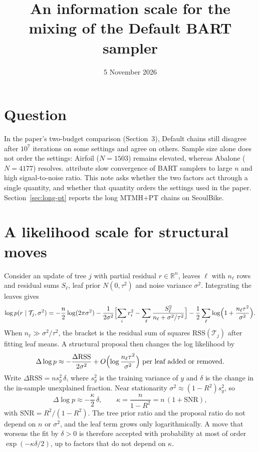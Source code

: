 \documentclass[11pt]{article}
\title{An information scale for the mixing of the Default BART sampler}
\author{}
\date{5 November 2026}
\begin{document}
\maketitle
\vspace{-1.5em}

\section{Question}
In the paper's two-budget comparison (Section~3), Default chains still disagree after $10^7$ iterations on some settings and agree on others. Sample size alone does not order the settings: Airfoil ($N=1503$) remains elevated, whereas Abalone ($N=4177$) resolves. \citet{tan2024computational} attribute slow convergence of BART samplers to large $n$ and high signal-to-noise ratio. This note asks whether the two factors act through a single quantity, and whether that quantity orders the settings used in the paper. Section~\ref{sec:long-pt} reports the long MTMH+PT chains on SeoulBike.

\section{A likelihood scale for structural moves}
\label{sec:scale}
Consider an update of tree $j$ with partial residual $r\in\mathbb R^n$, leaves $\ell$ with $n_\ell$ rows and residual sums $S_\ell$, leaf prior $N(0,\tau^2)$ and noise variance $\sigma^2$. Integrating the leaves gives
\begin{equation}
\log p(r\mid\mathcal T_j,\sigma^2) = -\frac{n}{2}\log(2\pi\sigma^2) - \frac{1}{2\sigma^2}\Bigl[\sum_i r_i^2 - \sum_\ell \frac{S_\ell^2}{n_\ell+\sigma^2/\tau^2}\Bigr] - \frac12\sum_\ell \log\Bigl(1+\frac{n_\ell\tau^2}{\sigma^2}\Bigr).
\label{eq:collapsed}
\end{equation}
When $n_\ell\gg\sigma^2/\tau^2$, the bracket is the residual sum of squares $\mathrm{RSS}(\mathcal T_j)$ after fitting leaf means. A structural proposal then changes the log likelihood by
\begin{equation}
\Delta\log p \approx -\frac{\Delta\mathrm{RSS}}{2\sigma^2} + O\Bigl(\log\frac{n_\ell\tau^2}{\sigma^2}\Bigr)\ \text{per leaf added or removed}.
\end{equation}
Write $\Delta\mathrm{RSS}=n s_y^2\,\delta$, where $s_y^2$ is the training variance of $y$ and $\delta$ is the change in the in-sample unexplained fraction. Near stationarity $\sigma^2\approx(1-R^2)s_y^2$, so
\begin{equation}
\Delta\log p \approx -\frac{\kappa}{2}\,\delta,\qquad \kappa=\frac{n}{1-R^2}=n\,(1+\mathrm{SNR}),
\label{eq:kappa}
\end{equation}
with $\mathrm{SNR}=R^2/(1-R^2)$. The tree prior ratio and the proposal ratio do not depend on $n$ or $\sigma^2$, and the leaf term grows only logarithmically. A move that worsens the fit by $\delta>0$ is therefore accepted with probability at most of order $\exp(-\kappa\delta/2)$, up to factors that do not depend on $\kappa$.
\end{document}
